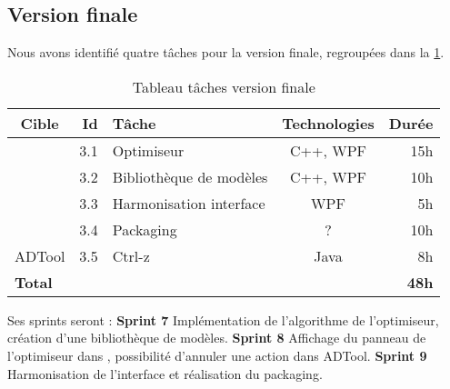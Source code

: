 	\subsection{Version finale}
		Nous avons identifié quatre tâches pour la version finale, regroupées dans la \ttable{} \ref{tab:taches_units_3}.
		\begin{table}[h]
			\centering
			\begin{tabular}{|c|r|l|c|r|}
				\hline
				\textbf{Cible} & \textbf{Id} & \textbf{Tâche} & \textbf{Technologies} & \textbf{Durée}\\
				\hline

				\multirow{4}{*}{\glasir{}} & 3.1 & Optimiseur & C++, WPF & 15h\\
				\cline{2-5}
				 & 3.2 & Bibliothèque de modèles & C++, WPF & 10h\\
				\cline{2-5}
				 & 3.3 & Harmonisation interface & WPF & 5h\\
				\cline{2-5}
				 & 3.4 & Packaging & ? & 10h\\
				\hline

				\multirow{1}{*}{ADTool} & 3.5 & Ctrl-z & \multirow{1}{*}{Java} & 8h\\
				\hline

				\multicolumn{4}{|l|}{\bf Total} & {\bf 48h}\\
				\hline
			\end{tabular}
			\caption{Tableau tâches version finale}
			\label{tab:taches_units_3}
		\end{table}
		\newline Ses sprints seront :\newline
		\textbf{Sprint 7} Implémentation de l'algorithme de l'optimiseur, création d'une bibliothèque de modèles.\newline
		\textbf{Sprint 8} Affichage du panneau de l'optimiseur dans \glasir{}, possibilité d'annuler une action dans ADTool.\newline
		\textbf{Sprint 9} Harmonisation de l'interface et réalisation du packaging. \newline